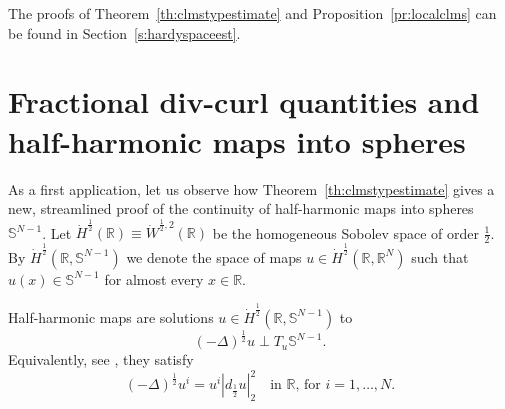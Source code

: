 \documentclass[12pt]{amsart}
\def\S{{\mathbb S}}
\theoremstyle{definition}
\newcommand{\R}{\mathbb{R}}
\numberwithin{theorem}{section} \numberwithin{equation}{section}
\newcommand{\lap}{\Delta }
\newcommand{\laph}{(-\lap)^{\frac{1}{2}}}
\begin{document}
The proofs of Theorem~\ref{th:clmstypestimate} and Proposition~\ref{pr:localclms} can be found in Section~\ref{s:hardyspaceest}. 





\section{Fractional   div-curl quantities and half-harmonic maps into spheres}\label{s:halfharmsphere}
As a first application, let us observe how Theorem~\ref{th:clmstypestimate} gives a new, streamlined proof of the continuity of half-harmonic maps into spheres $\S^{N-1}$. Let $\dot{H}^{\frac{1}{2}}(\R)\equiv \dot{W}^{\frac{1}{2},2}(\R)$ be the homogeneous Sobolev space of order $\frac{1}{2}$. By $\dot{H}^{\frac{1}{2}}(\R,\S^{N-1})$ we denote the space of maps $u \in \dot{H}^{\frac{1}{2}}(\R,\R^N)$ such that $u(x) \in \S^{N-1}$ for almost every $x \in \R$.

Half-harmonic maps are solutions $u \in \dot{H}^{\frac{1}{2}}(\R,\S^{N-1})$ to
\[
 \laph u \perp T_u \S^{N-1}.
\]
Equivalently, see \cite{Millot-Sire-2015}, they satisfy
\begin{equation}\label{eq:halfharmeq}
 \laph u^i = u^i |d_{\frac{1}{2}} u|_2^2 \quad \mbox{in $\R$, for $i = 1,\ldots,N$}.
\end{equation}
\end{document}
